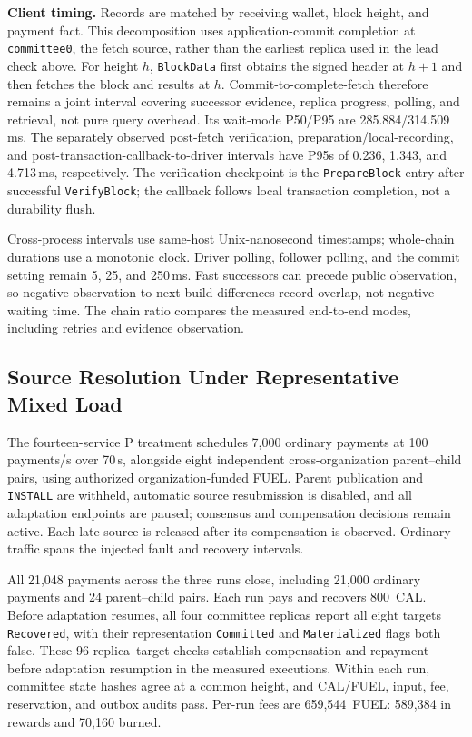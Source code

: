 \noindent\textbf{Client timing.}
Records are matched by receiving wallet, block height, and payment
fact. This decomposition uses application-commit completion at
\texttt{committee0}, the fetch source, rather than the earliest
replica used in the lead check above. For height $h$,
\texttt{BlockData} first obtains the signed header at $h+1$ and
then fetches the block and results at $h$. Commit-to-complete-fetch
therefore remains a joint interval covering successor evidence,
replica progress, polling, and retrieval, not pure query overhead.
Its wait-mode P50/P95 are 285.884/314.509\,ms. The separately
observed post-fetch verification, preparation/local-recording,
and post-transaction-callback-to-driver intervals have P95s of
0.236, 1.343, and 4.713\,ms, respectively. The verification
checkpoint is the \texttt{PrepareBlock} entry after successful
\texttt{VerifyBlock}; the callback follows local transaction
completion, not a durability flush.

Cross-process intervals use same-host Unix-nanosecond timestamps;
whole-chain durations use a monotonic clock. Driver polling,
follower polling, and the commit setting remain 5, 25, and
250\,ms. Fast successors can precede public observation, so
negative observation-to-next-build differences record overlap,
not negative waiting time. The chain ratio compares the measured
end-to-end modes, including retries and evidence observation.

\subsection{Source Resolution Under Representative Mixed Load}

The fourteen-service P treatment schedules 7,000 ordinary payments
at 100 payments/s over 70\,s, alongside eight independent
cross-organization parent--child pairs, using authorized
organization-funded FUEL. Parent publication and \texttt{INSTALL}
are withheld, automatic source resubmission is disabled, and all
adaptation endpoints are paused; consensus and compensation
decisions remain active. Each late source is released after its
compensation is observed. Ordinary traffic spans the injected
fault and recovery intervals.

All 21,048 payments across the three runs close, including
21,000 ordinary payments and 24 parent--child pairs. Each run
pays and recovers 800~CAL. Before adaptation resumes, all four
committee replicas report all eight targets \texttt{Recovered},
with their representation \texttt{Committed} and
\texttt{Materialized} flags both false. These 96 replica--target
checks establish compensation and repayment before adaptation
resumption in the measured executions. Within each run,
committee state hashes agree at a common height, and CAL/FUEL,
input, fee, reservation, and outbox audits pass. Per-run fees are
659,544~FUEL: 589,384 in rewards and 70,160 burned.


